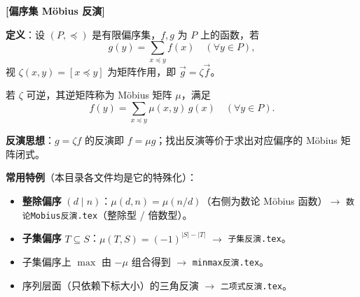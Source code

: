 \textbf{[偏序集 Möbius 反演]}

\textbf{定义}：设 $(P,\preceq)$ 是有限偏序集，$f,g$ 为 $P$ 上的函数，若
\[
g(y) = \sum_{x\preceq y} f(x) \quad(\forall y \in P),
\]
视 $\zeta(x,y)=[x\preceq y]$ 为矩阵作用，即 $\vec g = \zeta \vec f$。

若 $\zeta$ 可逆，其逆矩阵称为 Möbius 矩阵 $\mu$，满足
\[
f(y) = \sum_{x\preceq y} \mu(x,y)\, g(x) \quad(\forall y \in P).
\]

\textbf{反演思想}：$g=\zeta f$ 的反演即 $f=\mu g$；找出反演等价于求出对应偏序的 Möbius 矩阵闭式。

\textbf{常用特例}（本目录各文件均是它的特殊化）：
\begin{itemize}
\item \textbf{整除偏序} $(d\mid n)$：$\mu(d,n)=\mu(n/d)$（右侧为数论 Möbius 函数）$\to$ \texttt{数论Mobius反演.tex}（整除型 / 倍数型）。
\item \textbf{子集偏序} $T\subseteq S$：$\mu(T,S)=(-1)^{|S|-|T|}$ $\to$ \texttt{子集反演.tex}。
\item 子集偏序上 $\max$ 由 $-\mu$ 组合得到 $\to$ \texttt{minmax反演.tex}。
\item 序列层面（只依赖下标大小）的三角反演 $\to$ \texttt{二项式反演.tex}。
\end{itemize}

